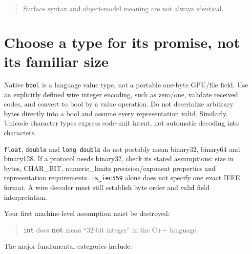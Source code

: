\begin{quote}
Surface syntax and object-model meaning are not always identical.
\end{quote}

\section{Choose a type for its promise, not its familiar size}\label{01-foundations-i-ch002-choose-a-type-for-its-promise-not-its-familiar-size}

Native \texttt{bool} is a language value type, not a portable one-byte GPU/file field. Use an explicitly defined wire integer encoding, such as zero/one, validate received codes, and convert to bool by a value operation. Do not deserialize arbitrary bytes directly into a bool and assume every representation valid. Similarly, Unicode character types express code-unit intent, not automatic decoding into characters.

\texttt{float}, \texttt{double} and \texttt{long\ double} do not portably mean binary32, binary64 and binary128. If a protocol needs binary32, check its stated assumptions: size in bytes, CHAR\_BIT, numeric\_limits precision/exponent properties and representation requirements. \texttt{is\_iec559} alone does not specify one exact IEEE format. A wire decoder must still establish byte order and valid field interpretation.

Your first machine-level assumption must be destroyed:

\begin{quote}
\texttt{int} does \textbf{not} mean ``32-bit integer'' in the C++ language.
\end{quote}

The major fundamental categories include:

